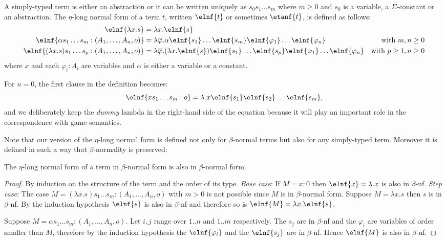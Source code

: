 \begin{dfn}
A simply-typed term is either an abstraction or it can be written uniquely as
$s_0 s_1 \ldots s_m$ where $m\geq0$ and $s_0$ is a variable, a $\Sigma$-constant or an abstraction.
The $\eta$-long normal form of a term $t$, written $\elnf{t}$ or sometimes $\etanf{t}$,
is defined as follows:
\begin{align*}
\elnf{\lambda x . s } &= \lambda x . \elnf{s} \\
\elnf{\alpha s_1 \ldots s_m : (A_1,\ldots,A_n,o)} &= \lambda \overline{\varphi} . \alpha \elnf{s_1}\ldots \elnf{s_m} \elnf{\varphi_1} \ldots \elnf{\varphi_n}
& \mbox{with $m,n\geq0$}\\
\elnf{(\lambda x . s) s_1 \ldots s_p : (A_1,\ldots,A_n,o) } &= \lambda \overline{\varphi} . (\lambda x . \elnf{s}) \elnf{s_1} \ldots \elnf{s_p} \elnf{\varphi_1} \ldots \elnf{\varphi_n}
& \mbox{with $p\geq 1,n\geq 0$}
\end{align*}
where $x$ and each $\varphi_i : A_i$ are variables and $\alpha$ is
either a variable or a constant.
\end{dfn}

For $n=0$, the first clause in the definition becomes:
$$\elnf{x s_1 \ldots s_m : o} = \lambda . x \elnf{s_1} \elnf{s_2} \ldots \elnf{s_m},$$
and we deliberately keep the \textsl{dummy} lambda in the right-hand
side of the equation because it will play an important role in the
correspondence with game semantics.



Note that our version of the $\eta$-long normal form is defined not only for $\beta$-normal terms but also for any simply-typed term.
Moreover it is defined in such a way that $\beta$-normality is preserved:
\begin{lem}
The $\eta$-long normal form of a term in $\beta$-normal form is also in $\beta$-normal form.
\end{lem}
\begin{proof}
By induction on the structure of the term and the order of its type.
\emph{Base case}:
If $M=x:0$ then $\elnf{x} = \lambda . x$ is also in $\beta$-nf.
\emph{Step case}:
The case $M = (\lambda x . s) s_1 \ldots s_m : (A_1,\ldots,A_n,o)$ with $m>0$ is not possible since $M$ is in
$\beta$-normal form.
Suppose $M = \lambda x . s$ then $s$ is in $\beta$-nf. By the induction hypothesis $\elnf{s}$ is also in $\beta$-nf and therefore
so is $\elnf{M} = \lambda x . \elnf{s}$.

Suppose $M= \alpha s_1 \ldots s_m : (A_1,\ldots,A_n,o)$. Let $i,j$
range over $1..n$ and $1..m$ respectively. The $s_j$ are in
$\beta$-nf and the $\varphi_i$ are variables of order smaller than
$M$, therefore by the induction hypothesis the $\elnf{\varphi_i}$ and
the $\elnf{s_j}$ are in $\beta$-nf. Hence $\elnf{M}$ is also in
$\beta$-nf.
\end{proof}

